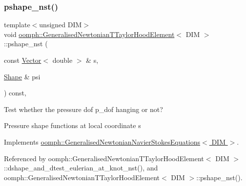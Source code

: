 \subsubsection{\texorpdfstring{pshape\+\_\+nst()}{pshape\_nst()}\hspace{0.1cm}{\footnotesize\ttfamily [1/4]}}
{\footnotesize\ttfamily template$<$unsigned D\+IM$>$ \\
void \hyperlink{classoomph_1_1GeneralisedNewtonianTTaylorHoodElement}{oomph\+::\+Generalised\+Newtonian\+T\+Taylor\+Hood\+Element}$<$ D\+IM $>$\+::pshape\+\_\+nst (\begin{DoxyParamCaption}\item[{const \hyperlink{classoomph_1_1Vector}{Vector}$<$ double $>$ \&}]{s,  }\item[{\hyperlink{classoomph_1_1Shape}{Shape} \&}]{psi }\end{DoxyParamCaption}) const\hspace{0.3cm}{\ttfamily [inline]}, {\ttfamily [virtual]}}



Test whether the pressure dof p\+\_\+dof hanging or not? 

Pressure shape functions at local coordinate s 

Implements \hyperlink{classoomph_1_1GeneralisedNewtonianNavierStokesEquations_a84735d21f3d1ade819726a71a7b462e1}{oomph\+::\+Generalised\+Newtonian\+Navier\+Stokes\+Equations$<$ D\+I\+M $>$}.



Referenced by oomph\+::\+Generalised\+Newtonian\+T\+Taylor\+Hood\+Element$<$ D\+I\+M $>$\+::dshape\+\_\+and\+\_\+dtest\+\_\+eulerian\+\_\+at\+\_\+knot\+\_\+nst(), and oomph\+::\+Generalised\+Newtonian\+T\+Taylor\+Hood\+Element$<$ D\+I\+M $>$\+::pshape\+\_\+nst().

\mbox{\label{classoomph_1_1GeneralisedNewtonianTTaylorHoodElement_a28c35b910b1c8f01677a7102c83ed94e}} 
